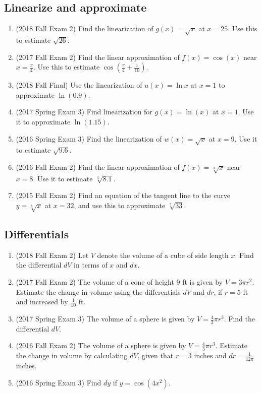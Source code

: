 \documentclass[10pt]{scrartcl}
\begin{document}
\subsection{Linearize and approximate}
\begin{enumerate}
\item (2018 Fall Exam 2) Find the linearization of $g(x) = \sqrt{x}$ at $x = 25$. Use this to estimate $\sqrt{26}$.
\item (2017 Fall Exam 2) Find the linear approximation of $f(x) = \cos(x)$ near $x = \frac{\pi}{4}$. Use this to estimate $\cos(\frac\pi4+\frac{1}{10})$.
\item (2018 Fall Final) Use the linearization of $u(x) = \ln x$ at $x = 1$ to approximate $\ln(0.9)$.
\item (2017 Spring Exam 3) Find linearization for $g(x) = \ln(x)$ at $x = 1$. Use it to approximate $\ln(1.15)$.
\item (2016 Spring Exam 3) Find the linearization of $w(x) = \sqrt{x}$ at $x = 9$. Use it to estimate $\sqrt{9.6}$.
\item (2016 Fall Exam 2) Find the linear approximation of $f(x) = \sqrt[3]{x}$ near $x = 8$. Use it to estimate $\sqrt[3]{8.1}$.
\item (2015 Fall Exam 2) Find an equation of the tangent line to the curve $y = \sqrt[5]{x}$ at $x = 32$, and use this to approximate $\sqrt[5]{33}$.
\end{enumerate}

\subsection{Differentials}
\begin{enumerate}
\item (2018 Fall Exam 2) Let $V$ denote the volume of a cube of side length $x$. Find the differential $dV$ in terms of $x$ and $dx$.
\item (2017 Fall Exam 2) The volume of a cone of height 9 ft is given by $V = 3\pi r^2$. Estimate the change in volume using the differentials $dV$ and $dr$, if $r = 5$ ft and increased by $\frac{1}{10}$ ft.
\item (2017 Spring Exam 3) The volume of a sphere is given by $V = \frac 43 \pi r^3$. Find the differential $dV$.
\item (2016 Fall Exam 2) The volume of a sphere is given by $V = \frac 43 \pi r^3$. Estimate the change in volume by calculating $dV$, given that $r = 3$ inches and $dr = \frac{1}{12\pi}$ inches.
\item (2016 Spring Exam 3) Find $dy$ if $y = \cos(4x^2)$.
\end{enumerate}
\end{document}
